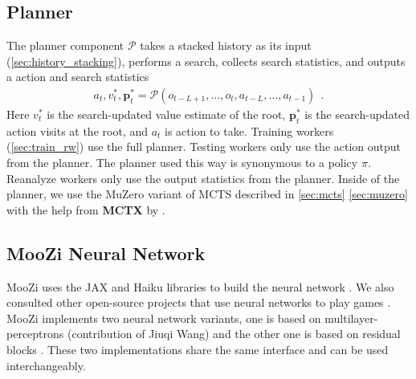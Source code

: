 \subsection{Planner} \label{sec:planner}
The planner component $\mathcal{P}$ takes a stacked history as its input (\ref{sec:history_stacking}), performs a search, collects search statistics, and outputs a action and search statistics
\begin{align*}
    a_t, v^*_t, \mathbf{p}^*_t = \mathcal{P}(o_{t - L + 1}, \dots, o_t, a_{t - L}, \dots, a_{t - 1}) ~~ .
\end{align*}
Here $v^*_t$ is the search-updated value estimate of the root, $\mathbf{p}^*_t$ is the search-updated action visits at the root, and $a_t$ is action to take.
Training workers (\ref{sec:train_rw}) use the full planner.
Testing workers only use the action output from the planner.
The planner used this way is synonymous to a policy $\pi$.
Reanalyze workers only use the output statistics from the planner.
Inside of the planner, we use the MuZero variant of MCTS described in \ref{sec:mcts} \ref{sec:muzero} with the help from \textbf{MCTX} by \citeauthor{POLICYIMPROVEMENTPLANNING_Danihelka.Guez.ea_2022} \cite{POLICYIMPROVEMENTPLANNING_Danihelka.Guez.ea_2022}.

\subsection{MooZi Neural Network} \label{sec:nn}
MooZi uses the JAX and Haiku libraries to build the neural network \cite{HaikuSonnetJAX_Hennigan.Cai.ea_2020,CompilingMachineLearning_Frostig.Johnson.ea_2019,JAXComposableTransformations_JamesBradbury.RoyFrostig.ea_2018}.
We also consulted other open-source projects that use neural networks to play games \cite{MuZeroGeneral_Duvaud.AureleHainaut_2022, MasteringAtariGames_Ye.Liu.ea_2021, AcceleratingSelfPlayLearning_Wu_2020}.
MooZi implements two neural network variants, one is based on multilayer-perceptrons (contribution of Jiuqi Wang) and the other one is based on residual blocks \cite{DeepResidualLearning_He.Zhang.ea_2016}.
These two implementations share the same interface and can be used interchangeably.

